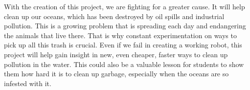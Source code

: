 With the creation of this project, we are fighting for a greater cause. It will help clean up our oceans, which has been destroyed by oil spills and industrial pollution. This is a growing problem that is spreading each day and endangering the animals that live there. That is why constant experimentation on ways to pick up all this trash is crucial. Even if we fail in creating a working robot, this project will help gain insight in new, even cheaper, faster ways to clean up pollution in the water. This could also be a valuable lesson for students to show them how hard it is to clean up garbage, especially when the oceans are so infested with it.